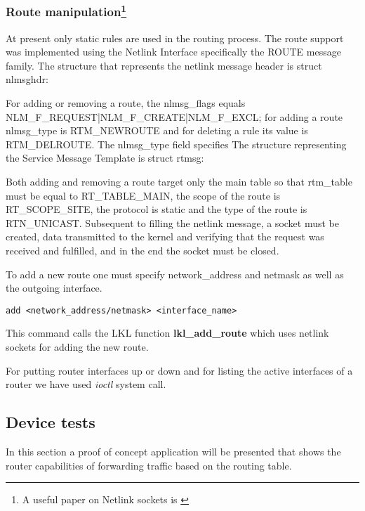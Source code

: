 {{\subsubsection[Route manipulation]{Route manipulation\footnote{A useful paper on Netlink sockets is \cite{netlinksockets}}}
At present only static rules are used in the routing process.
The route support was implemented using the Netlink Interface specifically the ROUTE message family.
The structure that represents the netlink message header is struct nlmsghdr:
\lstset{language=C, caption=Netlink Message Header Structure}

For adding or removing a route, the nlmsg_flags equals NLM_F_REQUEST|NLM_F_CREATE|NLM_F_EXCL; for adding a route nlmsg_type is RTM_NEWROUTE and for deleting a rule its value is RTM_DELROUTE.
The nlmsg_type field specifies 
The structure representing the Service Message Template is struct rtmsg:
\lstset{language=C, caption=Service Message Template Structure}

Both adding and removing a route target only the main table so that rtm_table must be equal to RT_TABLE_MAIN, the scope of the route is RT_SCOPE_SITE, the protocol is static and the type of the route is RTN_UNICAST.
Subsequent to filling the netlink message, a socket must be created, data transmitted to the kernel and verifying that the request was received and fulfilled, and in the end the socket must be closed.
\lstset{language=C, caption=Communicating with the kernel}
  

To add a new route one must specify network_address and netmask as well as the outgoing interface.
\lstset{language=TeX,caption=Adding a new interface,label=lst:saddrule}
\begin{lstlisting}
add <network_address/netmask> <interface_name> 
\end{lstlisting}  
This command calls the LKL function {\bf lkl_add_route} which uses netlink sockets for adding the new route.

For putting router interfaces up or down and for listing the active interfaces of a router we have used \textit{ioctl} system call.

\subsection{Device tests}
\label{sub-sec:router-tests}

In this section a proof of concept application will be presented that shows the router capabilities of forwarding traffic based on the routing table. 

}}
